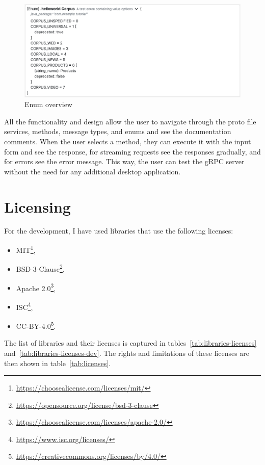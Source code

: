 \begin{figure}[hbt!]
    \centering
    \captionsetup{justification=centering}
    \includegraphics[width=1.0\textwidth]{images/implementation/screenshots/enum}
    \caption{Enum overview}
    \label{fig:implementation-screenshots-enum}
\end{figure}

All the functionality and design allow the user to navigate through the proto file services, methods, message types, and enums and see the documentation comments.
When the user selects a method, they can execute it with the input form and see the response, for streaming requests see the responses gradually, and for errors see the error message.
This way, the user can test the gRPC server without the need for any additional desktop application.


\section{Licensing}
For the development, I have used libraries that use the following licenses:
\begin{itemize}
    \item MIT\footnote{\url{https://choosealicense.com/licenses/mit/}},
    \item BSD-3-Clause\footnote{\url{https://opensource.org/license/bsd-3-clause}},
    \item Apache 2.0\footnote{\url{https://choosealicense.com/licenses/apache-2.0/}},
    \item ISC\footnote{\url{https://www.isc.org/licenses/}},
    \item CC-BY-4.0\footnote{\url{https://creativecommons.org/licenses/by/4.0/}}.
\end{itemize}

The list of libraries and their licenses is captured in tables~\ref{tab:libraries-licenses} and~\ref{tab:libraries-licenses-dev}.
The rights and limitations of these licenses are then shown in table~\ref{tab:licenses}.

